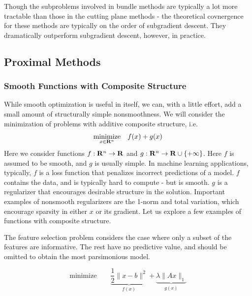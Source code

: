 Though the subproblems involved in bundle methods are typically a lot more tractable
than those in the cutting plane methods - the theoretical covnergence for these methods
are typically on the order of subgradient descent. They dramatically outperform
subgradient descent, however, in practice.

\subsection{Proximal Methods}

\subsubsection{Smooth Functions with Composite Structure} While smooth
optimization is useful in itself, we can, with a little effort, add a  small
amount of structurally simple nonsmoothness. We will consider the minimization
of problems with additive composite structure, i.e.
\begin{equation}
  \label{eq:minimize_fpg}
  \underset{x\in {\mathbf{R}}^n}{\text{minimize}} \quad f(x) + g(x)
\end{equation}
Here we consider functions $f:\mathbf{R}^n\to\mathbf{R}$ and
$g:\mathbf{R}^n\to\mathbf{R}\cup\{+\infty\}$. Here $f$ is assumed to be smooth, and $g$
is usually simple. In machine learning applications, typically, $f$ is a loss
function that penalizes incorrect predictions of a model. $f$ contains the
data, and is typically hard to compute - but is smooth. $g$ is a regularizer
that encourages desirable structure in the solution. Important examples of
nonsmooth regularizers are the 1-norm and total variation, which encourage
sparsity in either $x$ or its gradient. Let us explore a few examples of functions
with composite structure.

\begin{example} 
The feature selection problem considers the case where
only a subset of the features are informative. The rest have no
predictive value, and should be omitted to obtain the most
parsimonious model. 
\end{example}

\begin{example}

\begin{equation}
\mbox{minimize}\qquad \underset{f(x)}{\underbrace{\frac{1}{2}\|x-b\|^{2}}}+\underset{g(x)}{\underbrace{\lambda\|Ax\|_{1}}}\end{equation}
\end{example}

